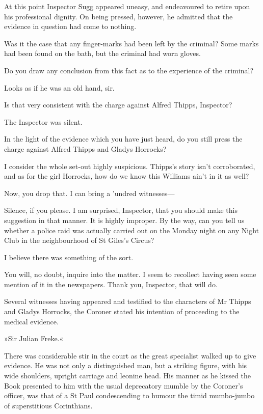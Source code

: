 At this point Inspector Sugg appeared uneasy, and endeavoured to retire upon his professional dignity. On being pressed, however, he admitted that the evidence in question had come to nothing.

\begin{dialogue}
 Was it the case that any finger-marks had been left by the criminal?
Some marks had been found on the bath, but the criminal had worn gloves.

 Do you draw any conclusion from this fact as to the experience of the criminal?

 Looks as if he was an old hand, sir.

 Is that very consistent with the charge against Alfred Thipps, Inspector?

The Inspector was silent.

 In the light of the evidence which you have just heard, do you still press the charge against Alfred Thipps and Gladys Horrocks?

 I consider the whole set-out highly suspicious. Thipps's story isn't corroborated, and as for the girl Horrocks, how do we know this Williams ain't in it as well?

 Now, you drop that. I can bring a 'undred witnesses---

 Silence, if you please. I am surprised, Inspector, that you should make this suggestion in that manner. It is highly improper. By the way, can you tell us whether a police raid was actually carried out on the Monday night on any Night Club in the neighbourhood of St Giles's Circus?

  I believe there was something of the sort.

 You will, no doubt, inquire into the matter. I seem to recollect having seen some mention of it in the newspapers. Thank you, Inspector, that will do.
\end{dialogue}

Several witnesses having appeared and testified to the characters of Mr Thipps and Gladys Horrocks, the Coroner stated his intention of proceeding to the medical evidence.

»Sir Julian Freke.«

There was considerable stir in the court as the great specialist walked up to give evidence. He was not only a distinguished man, but a striking figure, with his wide shoulders, upright carriage and leonine head. His manner as he kissed the Book presented to him with the usual deprecatory mumble by the Coroner's officer, was that of a St Paul condescending to humour the timid mumbo-jumbo of superstitious Corinthians.

